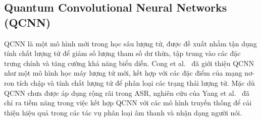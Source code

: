\documentclass[conference]{IEEEtran}
\begin{document}
\subsection{Quantum Convolutional Neural Networks (QCNN)}

QCNN là một mô hình mới trong học sâu lượng tử, được đề xuất nhằm tận dụng tính chất lượng tử để giảm số lượng tham số dư thừa, tập trung vào các đặc trưng chính và tăng cường khả năng biểu diễn. Cong et al.~\cite{Cong2019QuantumCNN} đã giới thiệu QCNN như một mô hình học máy lượng tử mới, kết hợp với các đặc điểm của mạng nơ-ron tích chập và tính chất lượng tử để phân loại các  trạng thái lượng tử. Mặc dù QCNN chưa được áp dụng rộng rãi trong ASR, nghiên cứu của Yang et al.~\cite{Yang2021Decentralizing} đã chỉ ra tiềm năng trong việc kết hợp QCNN với các mô hình truyền thống để cải thiện hiệu quả trong các tác vụ phân loại âm thanh và nhận dạng người nói.






\end{document}
